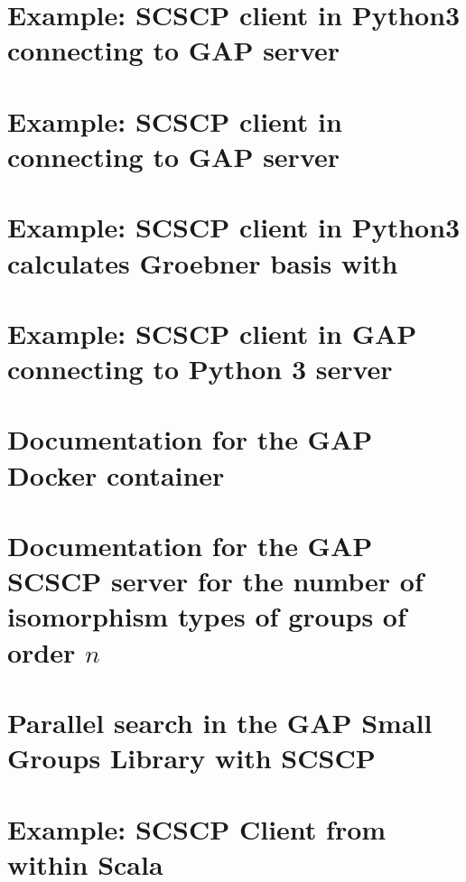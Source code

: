 \documentclass{deliverablereport}
\begin{document}
\section{Example: SCSCP client in Python3 connecting to GAP server}\label{python3-to-GAP}


\section{Example: SCSCP client in \Sage connecting to GAP server}\label{SageMath-to-GAP}


\section{Example: SCSCP client in Python3 calculates Groebner basis with \Singular}\label{Python3sympy-to-GAP-Singular}



\section{Example: SCSCP client in GAP connecting to Python 3 server}\label{GAP-to-Python3numpy}


\section{Documentation for the GAP Docker container}\label{SCSCP-with-GAP-docker}


\section{Documentation for the GAP SCSCP server for the number of isomorphism types of groups of order $n$}\label{Gnu-SCSCP-server}


\section{Parallel search in the GAP Small Groups Library with SCSCP}
\label{Parallel-GAP-SCSCP}


\section{Example: SCSCP Client from within  Scala}
\label{mmt-simple-example-SCSCP}


\end{document}
